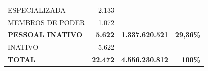 \documentclass{article}
\begin{document}
\begin{longtable}[c]{m{7cm}|m{2.5cm}|m{2.5cm}|m{2.5cm}}
\multicolumn{1}{L{7cm}|}{ \hspace{3em} ESPECIALIZADA} & \multicolumn{1}{r|}{  2.133} &  & \\
\multicolumn{1}{L{7cm}|}{ \hspace{3em} MEMBROS DE PODER} & \multicolumn{1}{r|}{  1.072} &  & \\
\multicolumn{1}{L{7cm}|}{ \textbf{PESSOAL INATIVO}} & \multicolumn{1}{r|}{ \textbf{ 5.622}} & \multicolumn{1}{r|}{ \textbf{1.337.620.521}} & \multicolumn{1}{r}{ \textbf{29,36\%}} \\
\multicolumn{1}{L{7cm}|}{ \hspace{3em} INATIVO} & \multicolumn{1}{r|}{  5.622} &  & \\
\hline \hline 
\multicolumn{1}{L{7cm}|}{ \textbf{TOTAL}} & \multicolumn{1}{r|}{ \textbf{22.472}} & \multicolumn{1}{r|}{ \textbf{4.556.230.812}} & \multicolumn{1}{r}{ \textbf{100\%}} \\
\end{longtable}
\newpage
\small
\end{document}
